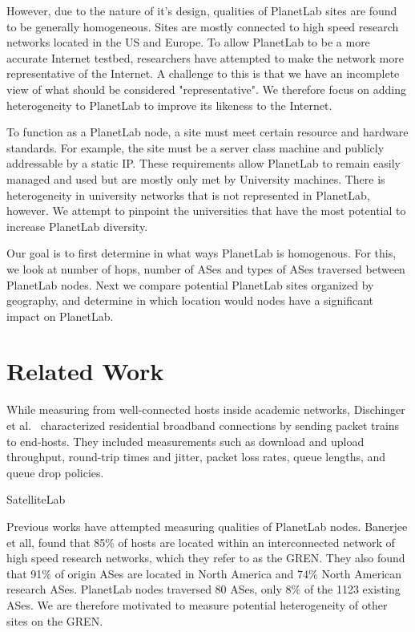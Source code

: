 \documentclass{sig-alternate-10pt}
\begin{document}
However, due to the nature of it's design, qualities of PlanetLab sites are
found to be generally homogeneous. Sites are mostly connected to high speed
research networks located in the US and Europe. To allow PlanetLab to be a more
accurate Internet testbed, researchers have attempted to make the network more
representative of the Internet. A challenge to this is that we have an
incomplete view of what should be considered "representative". We therefore
focus on adding heterogeneity to PlanetLab to improve its likeness to the
Internet.

To function as a PlanetLab node, a site must meet certain resource and hardware
standards. For example, the site must be a server class machine and publicly
addressable by a static IP. These requirements allow PlanetLab to remain easily
managed and used but are mostly only met by University machines. There is
heterogeneity in university networks that is not represented in PlanetLab,
however. We attempt to pinpoint the universities that have the most potential
to increase PlanetLab diversity.  

Our goal is to first determine in what ways PlanetLab is homogenous. For this,
we look at number of hops, number of ASes and types of ASes traversed between
PlanetLab nodes. Next we compare potential PlanetLab sites organized by
geography, and determine in which location would nodes have a significant
impact on PlanetLab. 


\section{Related Work} 

While measuring from well-connected hosts inside academic networks, Dischinger
et al.~\cite{dischinger:residential} characterized residential broadband
connections by sending packet trains to end-hosts. They included measurements
such as download and upload throughput, round-trip times and jitter, packet
loss rates, queue lengths, and queue drop policies. 

SatelliteLab~\cite{dischinger:satellitelab} 

Previous works have attempted measuring qualities of PlanetLab nodes. Banerjee
et all, found that 85\% of hosts are located within an interconnected network of
high speed research networks, which they refer to as the GREN. They also found
that 91\% of origin ASes are located in North America and 74\% North American
research ASes. PlanetLab nodes traversed 80 ASes, only 8\% of the 1123 existing
ASes. We are therefore motivated to measure potential heterogeneity of other
sites on the GREN.
\end{document}
